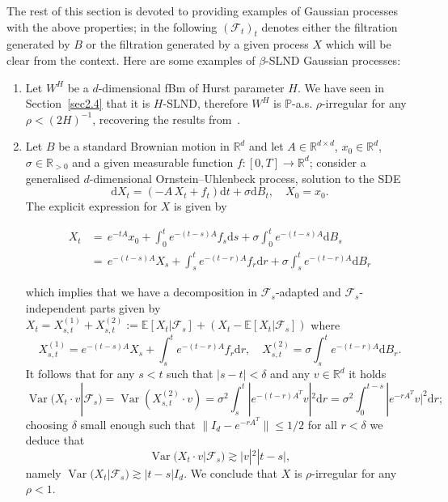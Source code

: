 \documentclass[10pt]{article}
\newcommand{\assign}{:=}
\newcommand{\mathd}{\mathrm{d}}
\newcommand{\nobracket}{}
\newcommand{\tmop}[1]{\ensuremath{\operatorname{#1}}}
\begin{document}
The rest of this section is devoted to providing examples of Gaussian
processes with the above properties; in the following $(\mathcal{F}_t)_t$
denotes either the filtration generated by $B$ or the filtration generated by
a given process $X$ which will be clear from the context. Here are some
examples of $\beta$\mbox{-}SLND Gaussian processes:
%
\begin{enumerate}[label=\roman*.]
    \item Let $W^H$ be a $d$-dimensional fBm of Hurst parameter $H$. We have
    seen in Section~\ref{sec2.4} that it is $H$\mbox{-}SLND, therefore $W^H$
    is $\mathbb{P}$-a.s. $\rho$\mbox{-}irregular for any $\rho < (2 H)^{- 1}$,
    recovering the results from~{\cite{catelliergubinelli}}.
    
    \item Let $B$ be a standard Brownian motion in $\mathbb{R}^d$ and let $A
    \in \mathbb{R}^{d \times d}$, $x_0 \in \mathbb{R}^d$, $\sigma \in
    \mathbb{R}_{> 0}$ and a given measurable function $f : [0, T] \rightarrow
    \mathbb{R}^d$; consider a generalised $d$-dimensional Ornstein--Uhlenbeck
    process, solution to the SDE
    \[ \mathd X_t = \left( - A \, X_t + f_t \right) \mathd t + \sigma \mathd
       B_t, \quad X_0 = x_0 . \]
    The explicit expression for $X$ is given by
    
    \begin{align*}
      X_t & = \, e^{- t A} x_0 + \int_0^t e^{- (t - s) A} f_s \mathd s +
      \sigma \int_0^t e^{- (t - s) A} \mathd B_s\\
      & = \, e^{- (t - s) A} X_s + \int_s^t e^{- (t - r) A} f_r \mathd r +
      \sigma \int_s^t e^{- (t - r) A} \mathd B_r
    \end{align*}
    
    which implies that we have a decomposition in $\mathcal{F}_s$-adapted and
    $\mathcal{F}_s$-independent parts given by $X_t = X_{s, t}^{(1)} + X_{s,
    t}^{(2)} \assign \mathbb{E} [X_t | \mathcal{F}_s] + (X_t -\mathbb{E} [X_t
    | \mathcal{F}_s])$ where
    \[ X^{(1)}_{s, t} = e^{- (t - s) A} X_s + \int_s^t e^{- (t - r) A} f_r
       \mathd r, \quad X_{s, t}^{(2)} = \sigma \int_s^t e^{- (t - r) A} \mathd
       B_r . \]
    It follows that for any $s < t$ such that $| s - t | < \delta$ and any $v
    \in \mathbb{R}^d$ it holds
    \[ \tmop{Var} (X_t \cdot v | \mathcal{F}_s \nobracket) = \tmop{Var}
       (X^{(2)}_{s, t} \cdot v) = \sigma^2 \int_s^t | e^{- (t - r) A^T} v |^2
       \mathd r = \sigma^2 \int_0^{t - s} | e^{- r A^T} v |^2 \mathd r ; \]
    choosing $\delta$ small enough such that $\| I_d - e^{- r A^T} \|
    \leqslant 1 / 2$ for all $r < \delta$ we deduce that
    \[ \tmop{Var} (X_t \cdot v | \mathcal{F}_s \nobracket) \gtrsim | v |^2  |
       t - s |, \]
    namely $\tmop{Var} (X_t | \mathcal{F}_s \nobracket) \gtrsim | t - s |
    I_d$. We conclude that $X$ is $\rho$-irregular for any $\rho < 1$.
    

\end{enumerate}
\end{document}
